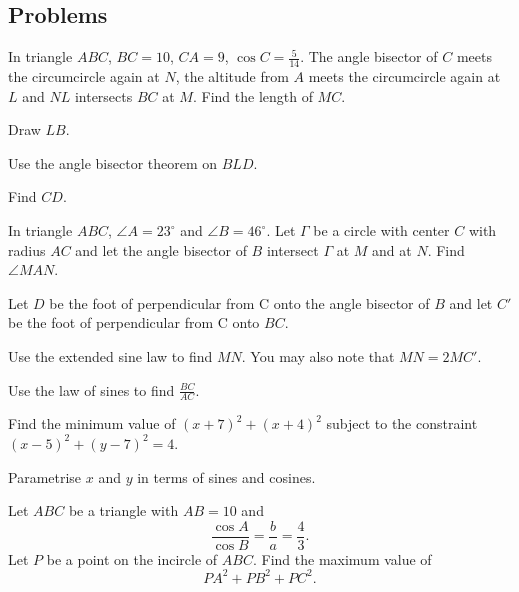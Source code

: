 \documentclass[../jarvis.tex]{subfiles}
\begin{document}
\subsection{Problems}
\problem[2019 SMO(O) P18] In triangle $ABC$, $BC=10$, $CA=9$, $\cos{C}=\frac{5}{14}$. The angle bisector of $C$ meets the circumcircle again at $N$, the altitude from $A$ meets the circumcircle again at $L$ and $NL$ intersects $BC$ at $M$. Find the length of $MC$.
\begin{hints}
    \begin{hint}
        Draw $LB$.
    \end{hint}
    \begin{hint}
        Use the angle bisector theorem on $BLD$.
    \end{hint}
    \begin{hint}
        Find $CD$.
    \end{hint}
\end{hints} 
In triangle $ABC$, $\angle A=23^{\circ}$ and $\angle B=46^{\circ}$. Let $\Gamma$ be a circle with center $C$ with radius $AC$ and let the angle bisector of $B$ intersect $\Gamma$ at $M$ and at $N$. Find $\angle MAN$.
\begin{hints}
    \begin{hint}
        Let $D$ be the foot of perpendicular from C onto the angle bisector of $B$ and let $C'$ be the foot of perpendicular from C onto $BC$.
    \end{hint}
    \begin{hint}
        Use the extended sine law to find $MN$. You may also note that $MN=2MC'$.
    \end{hint}
    \begin{hint}
        Use the law of sines to find $\frac{BC}{AC}$.
    \end{hint}
\end{hints}
\problem[2021 SMO(O) P8] Find the minimum value of $(x+7)^2+(x+4)^2$ subject to the constraint $(x-5)^2+(y-7)^2=4$.
\begin{hints}
    \begin{hint}
        Parametrise $x$ and $y$ in terms of sines and cosines.
    \end{hint}
\end{hints}
\problem[2021 SMO(O) P18] Let $ABC$ be a triangle with $AB=10$ and
$$\frac{\cos{A}}{\cos{B}}=\frac{b}{a}=\frac{4}{3}.$$
Let $P$ be a point on the incircle of $ABC$. Find the maximum value of 
$$PA^2+PB^2+PC^2.$$
\end{document}
